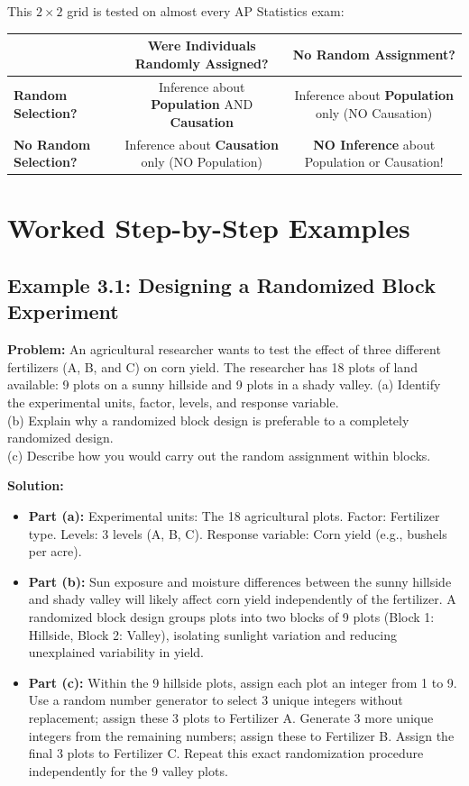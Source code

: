 \begin{lessonbox}
This $2 \times 2$ grid is tested on almost every AP Statistics exam:
\begin{center}
\begin{tabular}{|l|c|c|}
\hline
& \textbf{Were Individuals Randomly Assigned?} & \textbf{No Random Assignment?} \\
\hline
\textbf{Random Selection?} & Inference about \textbf{Population} AND \textbf{Causation} & Inference about \textbf{Population} only (NO Causation) \\
\hline
\textbf{No Random Selection?} & Inference about \textbf{Causation} only (NO Population) & \textbf{NO Inference} about Population or Causation! \\
\hline
\end{tabular}
\end{center}
\end{lessonbox}

\section{Worked Step-by-Step Examples}

\subsection*{Example 3.1: Designing a Randomized Block Experiment}
\textbf{Problem:} An agricultural researcher wants to test the effect of three different fertilizers (A, B, and C) on corn yield. The researcher has 18 plots of land available: 9 plots on a sunny hillside and 9 plots in a shady valley.
(a) Identify the experimental units, factor, levels, and response variable.\\
(b) Explain why a randomized block design is preferable to a completely randomized design.\\
(c) Describe how you would carry out the random assignment within blocks.

\textbf{Solution:}
\begin{itemize}[leftmargin=1.2em]
  \item \textbf{Part (a):} Experimental units: The 18 agricultural plots. Factor: Fertilizer type. Levels: 3 levels (A, B, C). Response variable: Corn yield (e.g., bushels per acre).
  \item \textbf{Part (b):} Sun exposure and moisture differences between the sunny hillside and shady valley will likely affect corn yield independently of the fertilizer. A randomized block design groups plots into two blocks of 9 plots (Block 1: Hillside, Block 2: Valley), isolating sunlight variation and reducing unexplained variability in yield.
  \item \textbf{Part (c):} Within the 9 hillside plots, assign each plot an integer from 1 to 9. Use a random number generator to select 3 unique integers without replacement; assign these 3 plots to Fertilizer A. Generate 3 more unique integers from the remaining numbers; assign these to Fertilizer B. Assign the final 3 plots to Fertilizer C. Repeat this exact randomization procedure independently for the 9 valley plots.
\end{itemize}


